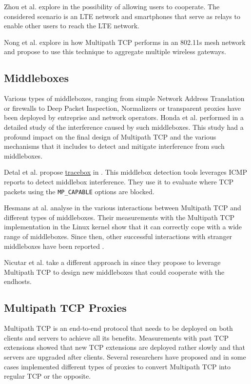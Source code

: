 Zhou et al. explore in \cite{Zhou_cooperation:2015} the possibility of allowing users to cooperate. The considered scenario is an LTE network and smartphones that serve as relays to enable other users to reach the LTE network.

Nong et al. explore in \cite{Nong_Aggregating:2014} how Multipath TCP performs in an 802.11s mesh network and propose to use this technique to aggregate multiple wireless gateways.

\subsection{Middleboxes}

Various types of middleboxes, ranging from simple Network Address Translation or firewalls to Deep Packet Inspection, Normalizers or transparent proxies have been deployed by entreprise and network operators. Honda et al. performed in \cite{Honda_Extend:2011} a detailed study of the interference caused by such middleboxes. This study had a profound impact on the final design of Multipath TCP and the various mechanisms that it includes to detect and mitigate interference from such middleboxes.

Detal et al. propose \href{http://tracebox.org}{tracebox} in \cite{Detal_tracebox:2013}. This middlebox detection tools leverages ICMP reports to detect middlebox interference. They use it to evaluate where TCP packets using the \texttt{MP\_CAPABLE} options are blocked.

Hesmans at al. analyse in \cite{Hesmans_Extensions:2013} the various interactions between Multipath TCP and different types of middleboxes. Their measurements with the Multipath TCP implementation in the Linux kernel show that it can correctly cope with a wide range of middleboxes. Since then, other successful interactions with stranger middleboxes have been reported \cite{draft-ietf-mptcp-experience}.

Nicutar et al. take a different approach in \cite{Nicutar_Acrobatics:2013} since they propose to leverage Multipath TCP to design new middleboxes that could cooperate with the endhosts.

\subsection{Multipath TCP Proxies}

Multipath TCP is an end-to-end protocol that needs to be deployed on both clients and servers to achieve all its benefits.
Measurements with past TCP extensions showed that new TCP extensions are deployed rather slowly and that servers are
upgraded after clients. Several researchers have proposed
and in some cases implemented different types of proxies to convert Multipath TCP into regular TCP or the opposite.

